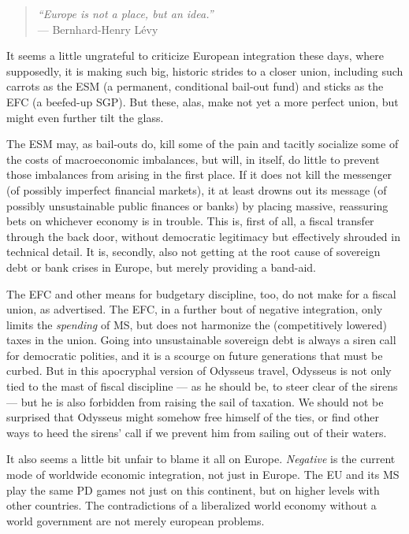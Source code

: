 \begin{quote}
	\emph{``Europe is not a place, but an idea.''} \\ %
	--- Bernhard-Henry L\'{e}vy
\end{quote}

It seems a little ungrateful to criticize European integration these days, where supposedly, it is making such big, historic strides to a closer union, including such carrots as the \gls{ESM} (a permanent, conditional bail-out fund) and sticks as the \gls{EFC} (a beefed-up \gls{SGP}). But these, alas, make not yet a more perfect union, but might even further tilt the glass. 

The \gls{ESM} may, as bail-outs do, kill some of the pain and tacitly socialize some of the costs of macroeconomic imbalances, but will, in itself, do little to prevent those imbalances from arising in the first place. If it does not kill the messenger (of possibly imperfect financial markets), it at least drowns out its message (of possibly unsustainable public finances or banks) by placing massive, reassuring bets on whichever economy is in trouble. This is, first of all, a fiscal transfer through the back door, without democratic legitimacy but effectively  shrouded in technical detail. It is, secondly, also not getting at the root cause of sovereign debt or bank crises in Europe, but merely providing a band-aid.

The \gls{EFC} and other means for budgetary discipline, too, do not make for a fiscal union, as advertised. The \gls{EFC}, in a further bout of negative integration, only limits the \emph{spending} of \gls{MS}, but does not harmonize the (competitively lowered) taxes in the union. Going into unsustainable sovereign debt is always a siren call for democratic polities, and it is a scourge on future generations that must be curbed. But in this apocryphal version of Odysseus travel, Odysseus is not only tied to the mast of fiscal discipline --- as he should be, to steer clear of the sirens --- but he is also forbidden from raising the sail of taxation. We should not be surprised that Odysseus might somehow free himself of the ties, or find other ways to heed the sirens' call if we prevent him from sailing out of their waters.

It also seems a little bit unfair to blame it all on Europe. \emph{Negative} is the current mode of worldwide economic integration, not just in Europe. The \gls{EU} and its \gls{MS} play the same \gls{PD} games not just on this continent, but on higher levels with other countries. The contradictions of a liberalized world economy without a world government are not merely european problems.


